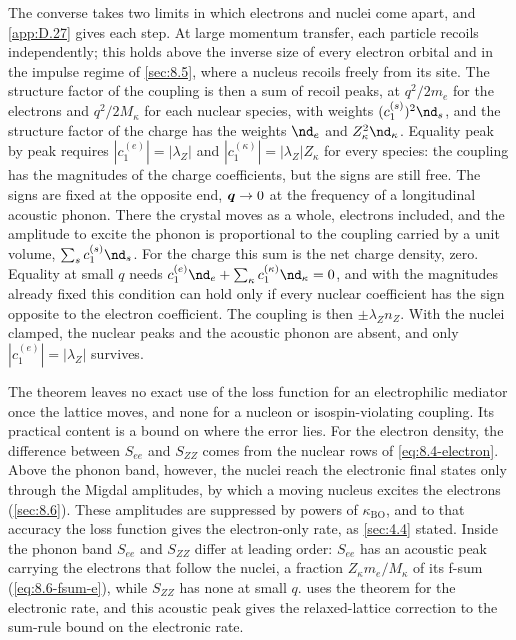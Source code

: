 The converse takes two limits in which electrons and nuclei come apart, and \cref{app:D.27} gives each step. At large momentum transfer, each particle recoils independently; this holds above the inverse size of every electron orbital and in the impulse regime of \cref{sec:8.5}, where a nucleus recoils freely from its site. The structure factor of the coupling is then a sum of recoil peaks, at $q^2/2m_e$ for the electrons and $q^2/2M_\kappa$ for each nuclear species, with weights $(c_1^{(s)})^2\nd_s$, and the structure factor of the charge has the weights $\nd_e$ and $Z_\kappa^2\nd_\kappa$. Equality peak by peak requires $|c_1^{(e)}| = |\lambda_Z|$ and $|c_1^{(\kappa)}| = |\lambda_Z|Z_\kappa$ for every species: the coupling has the magnitudes of the charge coefficients, but the signs are still free. The signs are fixed at the opposite end, $\bm{q} \to 0$ at the frequency of a longitudinal acoustic phonon. There the crystal moves as a whole, electrons included, and the amplitude to excite the phonon is proportional to the coupling carried by a unit volume, $\sum_sc_1^{(s)}\nd_s$. For the charge this sum is the net charge density, zero. Equality at small $q$ needs $c_1^{(e)}\nd_e + \sum_\kappa c_1^{(\kappa)}\nd_\kappa = 0$, and with the magnitudes already fixed this condition can hold only if every nuclear coefficient has the sign opposite to the electron coefficient. The coupling is then $\pm\lambda_Zn_Z$. With the nuclei clamped, the nuclear peaks and the acoustic phonon are absent, and only $|c_1^{(e)}| = |\lambda_Z|$ survives.

The theorem leaves no exact use of the loss function for an electrophilic mediator once the lattice moves, and none for a nucleon or isospin-violating coupling. Its practical content is a bound on where the error lies. For the electron density, the difference between $S_{ee}$ and $S_{ZZ}$ comes from the nuclear rows of \cref{eq:8.4-electron}. Above the phonon band, however, the nuclei reach the electronic final states only through the Migdal amplitudes, by which a moving nucleus excites the electrons (\cref{sec:8.6}). These amplitudes are suppressed by powers of $\kappa_{\mathrm{BO}}$, and to that accuracy the loss function gives the electron-only rate, as \cref{sec:4.4} stated. Inside the phonon band $S_{ee}$ and $S_{ZZ}$ differ at leading order: $S_{ee}$ has an acoustic peak carrying the electrons that follow the nuclei, a fraction $Z_\kappa m_e/M_\kappa$ of its f-sum (\cref{eq:8.6-fsum-e}), while $S_{ZZ}$ has none at small $q$.  uses the theorem for the electronic rate, and this acoustic peak gives the relaxed-lattice correction to the sum-rule bound on the electronic rate.

